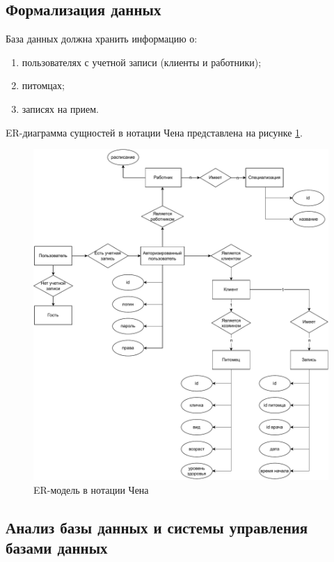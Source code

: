 \subsection{Формализация данных}

База данных должна хранить информацию о:
\begin{enumerate}[label*=---]
	\item пользователях с учетной записи (клиенты и работники);
	\item питомцах;
	\item записях на прием.
\end{enumerate}

ER-диаграмма сущностей в нотации Чена представлена на рисунке \ref{img:er}.

\begin{figure}[!h!]
	\centering
	\includegraphics[width=165mm]{image/er.pdf}
	\caption{ER-модель в нотации Чена}
	\label{img:er}
\end{figure}

\subsection{Анализ базы данных и системы управления базами данных}

